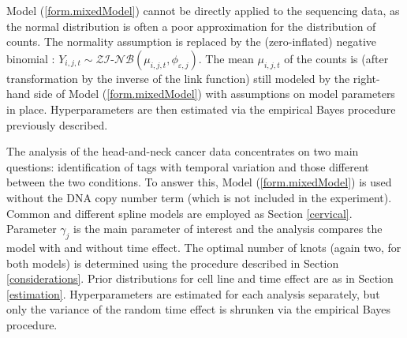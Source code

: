 Model (\ref{form.mixedModel}) cannot be directly applied to the sequencing data, as the normal distribution is often a poor approximation for the distribution of counts. The normality assumption is replaced by the (zero-inflated) negative binomial \cite{RobinsonSmyth2007, Mark2013}: $Y_{i,j,t} \sim \mathcal{ZI}$-$\mathcal{NB}(\mu_{i, j,t}, \phi_{\varepsilon,j})$. The mean $\mu_{i,j,t}$ of the counts is (after transformation by the inverse of the link function) still modeled by the right-hand side of Model (\ref{form.mixedModel}) with assumptions on model parameters in place. Hyperparameters are then estimated via the empirical Bayes procedure previously described.

The analysis of the head-and-neck cancer data concentrates on two main questions: identification of tags with temporal variation and those different between the two conditions. To answer this, Model (\ref{form.mixedModel}) is used without the DNA copy number term (which is not included in the experiment). Common and different spline models are employed as Section \ref{cervical}. Parameter $\gamma_j$ is the main parameter of interest and the analysis compares the model with and without time effect. The optimal number of knots (again two, for both models) is determined using the procedure described in Section \ref{considerations}. Prior distributions for cell line and time effect are as in Section \ref{estimation}. Hyperparameters are estimated for each analysis separately, but only the variance of the random time effect is shrunken via the empirical Bayes procedure.

